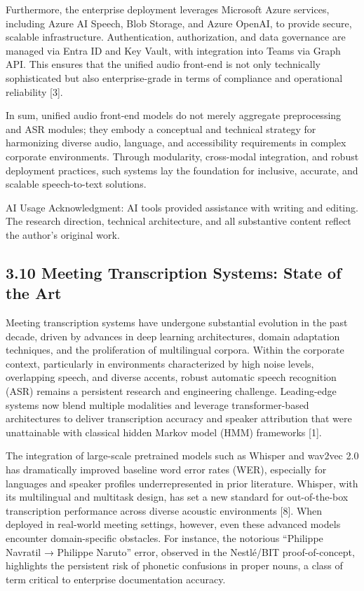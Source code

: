 \documentclass[12pt,a4paper]{article}
\begin{document}
Furthermore, the enterprise deployment leverages Microsoft Azure services, including Azure AI Speech, Blob Storage, and Azure OpenAI, to provide secure, scalable infrastructure. Authentication, authorization, and data governance are managed via Entra ID and Key Vault, with integration into Teams via Graph API. This ensures that the unified audio front-end is not only technically sophisticated but also enterprise-grade in terms of compliance and operational reliability [3].


In sum, unified audio front-end models do not merely aggregate preprocessing and ASR modules; they embody a conceptual and technical strategy for harmonizing diverse audio, language, and accessibility requirements in complex corporate environments. Through modularity, cross-modal integration, and robust deployment practices, such systems lay the foundation for inclusive, accurate, and scalable speech-to-text solutions.


AI Usage Acknowledgment: AI tools provided assistance with writing and editing. The research direction, technical architecture, and all substantive content reflect the author’s original work.


\subsection{3.10 Meeting Transcription Systems: State of the Art}


Meeting transcription systems have undergone substantial evolution in the past decade, driven by advances in deep learning architectures, domain adaptation techniques, and the proliferation of multilingual corpora. Within the corporate context, particularly in environments characterized by high noise levels, overlapping speech, and diverse accents, robust automatic speech recognition (ASR) remains a persistent research and engineering challenge. Leading-edge systems now blend multiple modalities and leverage transformer-based architectures to deliver transcription accuracy and speaker attribution that were unattainable with classical hidden Markov model (HMM) frameworks [1].


The integration of large-scale pretrained models such as Whisper and wav2vec 2.0 has dramatically improved baseline word error rates (WER), especially for languages and speaker profiles underrepresented in prior literature. Whisper, with its multilingual and multitask design, has set a new standard for out-of-the-box transcription performance across diverse acoustic environments [8]. When deployed in real-world meeting settings, however, even these advanced models encounter domain-specific obstacles. For instance, the notorious “Philippe Navratil → Philippe Naruto” error, observed in the Nestlé/BIT proof-of-concept, highlights the persistent risk of phonetic confusions in proper nouns, a class of term critical to enterprise documentation accuracy.
\end{document}
